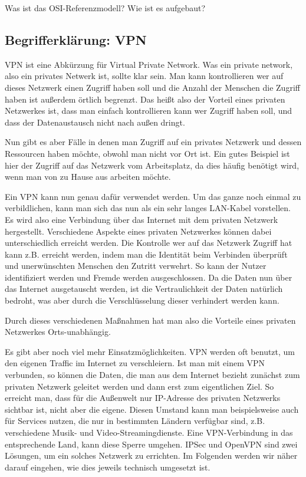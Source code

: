 \documentclass[12pt]{scrartcl}
\begin{document}
Was ist das OSI-Referenzmodell? Wie ist es aufgebaut?

\subsection{Begrifferklärung: VPN}
VPN ist eine Abkürzung für Virtual Private Network. Was ein private network, also ein privates Netwerk ist, sollte klar sein. Man kann kontrollieren wer auf dieses Netzwerk einen Zugriff haben soll und die Anzahl der Menschen die Zugriff haben ist außerdem örtlich begrenzt. Das heißt also der Vorteil eines privaten Netzwerkes ist, dass man einfach kontrollieren kann wer Zugriff haben soll, und dass der Datenaustausch nicht nach außen dringt.

Nun gibt es aber Fälle in denen man Zugriff auf ein privates Netzwerk und dessen Ressourcen haben möchte, obwohl man nicht vor Ort ist. Ein gutes Beispiel ist hier der Zugriff auf das Netzwerk vom Arbeitsplatz, da dies häufig benötigt wird, wenn man von zu Hause aus arbeiten möchte.

Ein VPN kann nun genau dafür verwendet werden. Um das ganze noch einmal zu verbildlichen, kann man sich das nun als ein sehr langes LAN-Kabel vorstellen. Es wird also eine Verbindung über das Internet mit dem privaten Netzwerk hergestellt. Verschiedene Aspekte eines privaten Netzwerkes können dabei unterschiedlich erreicht werden. Die Kontrolle wer auf das Netzwerk Zugriff hat kann z.B. erreicht werden, indem man die Identität beim Verbinden überprüft und unerwünschten Menschen den Zutritt verwehrt. So kann der Nutzer identifiziert werden und Fremde werden ausgeschlossen. Da die Daten nun über das Internet ausgetauscht werden, ist die Vertraulichkeit der Daten natürlich bedroht, was aber durch die Verschlüsselung dieser verhindert werden kann.

Durch dieses verschiedenen Maßnahmen hat man also die Vorteile eines privaten Netzwerkes Orts-unabhängig.

Es gibt aber noch viel mehr Einsatzmöglichkeiten. 
VPN werden oft benutzt, um den eigenen Traffic im Internet zu verschleiern. Ist man mit einem VPN verbunden, so können die Daten, die man aus dem Internet bezieht zunächst zum privaten Netzwerk geleitet werden und dann erst zum eigentlichen Ziel. So erreicht man, dass für die Außenwelt nur IP-Adresse des privaten Netzwerks sichtbar ist, nicht aber die eigene.
Diesen Umstand kann man beispielsweise auch für Services nutzen, die nur in bestimmten Ländern verfügbar sind, z.B. verschiedene Musik- und Video-Streamingdienste. Eine VPN-Verbindung in das entsprechende Land, kann diese Sperre umgehen. 
IPSec und OpenVPN sind zwei Lösungen, um ein solches Netzwerk zu errichten. Im Folgenden werden wir näher darauf eingehen, wie dies jeweils technisch umgesetzt ist.
\end{document}
